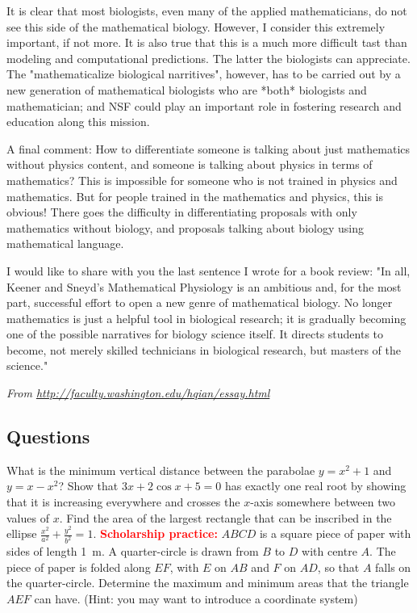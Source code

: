 It is clear that most biologists, even many of the applied mathematicians, do not see this side of the mathematical biology. However, I consider this extremely important, if not more. It is also true that this is a much more difficult tast than modeling and computational predictions. The latter the biologists can appreciate. The "mathematicalize biological narritives", however, has to be carried out by a new generation of mathematical biologists who are *both* biologists and mathematician; and NSF could play an important role in fostering research and education along this mission.

A final comment: How to differentiate someone is talking about just mathematics without physics content, and someone is talking about physics in terms of mathematics? This is impossible for someone who is not trained in physics and mathematics. But for people trained in the mathematics and physics, this is obvious! There goes the difficulty in differentiating proposals with only mathematics without biology, and proposals talking about biology using mathematical language.

I would like to share with you the last sentence I wrote for a book review: "In all, Keener and Sneyd's Mathematical Physiology is an ambitious and, for the most part, successful effort to open a new genre of mathematical biology. No longer mathematics is just a helpful tool in biological research; it is gradually becoming one of the possible narratives for biology science itself. It directs students to become, not merely skilled technicians in biological research, but masters of the science."

\textit{From \url{http://faculty.washington.edu/hqian/essay.html}}

\subsection*{Questions}
\begin{questions}
  \question What is the minimum vertical distance between the parabolae $ y = x^2 + 1 $ and $ y = x - x^2 $?
  \question Show that $ 3x + 2\cos x + 5 = 0 $ has exactly one real root by showing that it
            is increasing everywhere and crosses the $ x$-axis somewhere between two values of $ x $.
  \question Find the area of the largest rectangle that can be inscribed in the ellipse $ \frac{x^2}{a^2} + \frac{y^2}{b^2} = 1 $.
  \question \textbf{\textcolor{red}{Scholarship practice:}} $ ABCD $ is a square piece of paper with sides of length \SI{1}{\metre}. A
            quarter-circle is drawn from $ B $ to $ D $ with centre $ A $. The piece of paper is folded along $ EF $, with $ E $ on $ AB $
            and $ F $ on $ AD $, so that $ A $ falls on the quarter-circle. Determine the maximum and minimum areas that the triangle $ AEF $
            can have. (Hint: you may want to introduce a coordinate system)
\end{questions}

